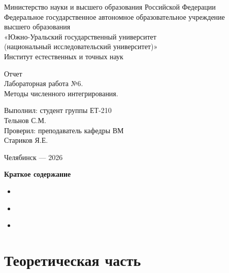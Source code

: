 \documentclass[a4paper]{article}
\begin{document}
\centering
Министерство науки и высшего образования Российской Федерации\\
Федеральное государственное автономное образовательное учреждение\\
высшего образования\\
«Южно-Уральский государственный университет\\
(национальный исследовательский университет)»\\
Институт естественных и точных наук

\setlength{\parskip}{7.5cm}

Отчет\\
Лабораторная работа №6.\\
Методы численного интегрирования.

\setlength{\parskip}{6.5cm}

\raggedleft
\begin{minipage}{0.345\textwidth}
\raggedright
Выполнил: студент группы ЕТ-210\\
Тельнов С.М.\\
Проверил: преподаватель кафедры ВМ\\
Стариков Я.Е.
\end{minipage}

\setlength{\parskip}{6cm}

\centering
Челябинск — 2026

\setlength{\parskip}{0pt plus 1pt}
\newpage

\setlength{\parskip}{0pt plus 1pt}

\centering
\textbf{Краткое содержание}
\begin{itemize}
    \setlength{\parskip}{0.4cm}
    \item \hyperref[sec:theory]{ \dotfill \pageref{sec:theory}}
    \item \hyperref[sec:practice]{ \dotfill \pageref{sec:practice}}
    \item \hyperref[sec:conclusion]{ \dotfill \pageref{sec:conclusion}}
\end{itemize}

\setlength{\parindent}{1.5em}

\raggedright

\section*{\centering\fontsize{14pt}{0pt}\selectfont\textbf{Теоретическая часть}\label{sec:theory}}
\end{document}
